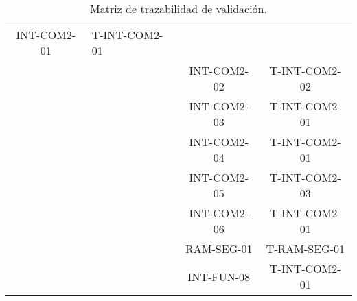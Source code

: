 \begin{table}[H]
\begin{tabular}{|c|l|c|c|}
  INT-COM2-01 &
  T-INT-COM2-01 \\ \cline{3-4} 
 &
   &
  INT-COM2-02 &
  T-INT-COM2-02 \\ \cline{3-4} 
 &
   &
  INT-COM2-03 &
  T-INT-COM2-01 \\ \cline{3-4} 
 &
   &
  INT-COM2-04 &
  T-INT-COM2-01 \\ \cline{3-4} 
 &
   &
  INT-COM2-05 &
  T-INT-COM2-03 \\ \cline{3-4} 
 &
   &
  INT-COM2-06 &
  T-INT-COM2-01 \\ \cline{3-4} 
 &
   &
  RAM-SEG-01 &
  T-RAM-SEG-01 \\ \cline{3-4} 
 &
   &
  INT-FUN-08 &
  T-INT-COM2-01 \\ \hline
\end{tabular}
\caption{Matriz de trazabilidad de validación.}
\end{table}